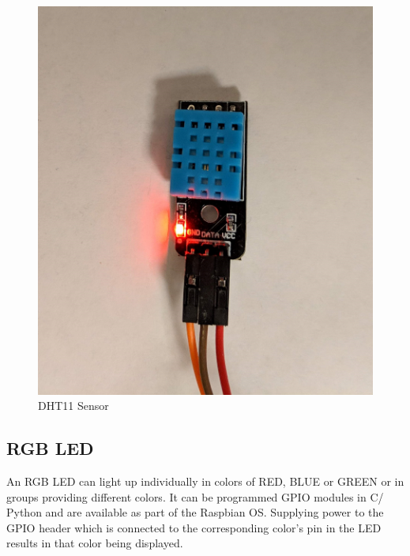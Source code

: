 \documentclass[11pt,openright]{report}
\begin{document}
\begin{figure}
    \centering
    \includegraphics[scale=0.1]{images/dht11.jpg}
    \caption{DHT11 Sensor}
    \label{fig:dht11}
\end{figure}

\subsection{RGB LED}
An RGB LED can light up individually in colors of RED, BLUE or GREEN or in groups providing different colors. It can be programmed GPIO modules in C/ Python and are available as part of the Raspbian OS. Supplying power to the GPIO header which is connected to the corresponding color’s pin in the LED results in that color being displayed.
\end{document}
